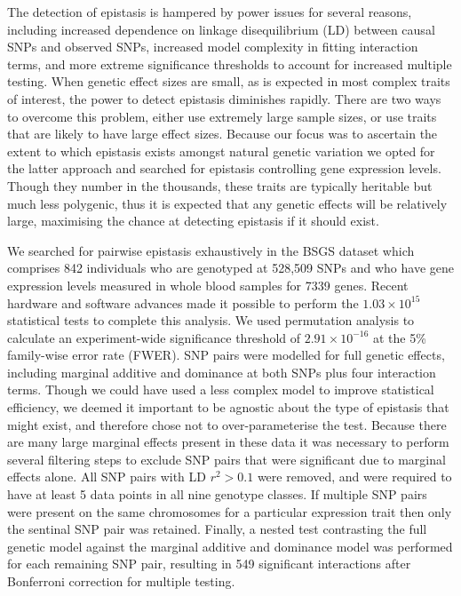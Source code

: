 \documentclass{article}
\begin{document}
The detection of epistasis is hampered by power issues for several reasons, including increased dependence on linkage disequilibrium (LD) between causal SNPs and observed SNPs, increased model complexity in fitting interaction terms, and more extreme significance thresholds to account for increased multiple testing. When genetic effect sizes are small, as is expected in most complex traits of interest, the power to detect epistasis diminishes rapidly. There are two ways to overcome this problem, either use extremely large sample sizes, or use traits that are likely to have large effect sizes. Because our focus was to ascertain the extent to which epistasis exists amongst natural genetic variation we opted for the latter approach and searched for epistasis controlling gene expression levels. Though they number in the thousands, these traits are typically heritable but much less polygenic, thus it is expected that any genetic effects will be relatively large, maximising the chance at detecting epistasis if it should exist.

We searched for pairwise epistasis exhaustively in the BSGS dataset which comprises 842 individuals who are genotyped at 528,509 SNPs and who have gene expression levels measured in whole blood samples for 7339 genes. Recent hardware and software advances made it possible to perform the $1.03 \times 10^{15}$ statistical tests to complete this analysis. We used permutation analysis to calculate an experiment-wide significance threshold of $2.91 \times 10^{-16}$ at the 5\% family-wise error rate (FWER). SNP pairs were modelled for full genetic effects, including marginal additive and dominance at both SNPs plus four interaction terms. Though we could have used a less complex model to improve statistical efficiency, we deemed it important to be agnostic about the type of epistasis that might exist, and therefore chose not to over-parameterise the test. Because there are many large marginal effects present in these data it was necessary to perform several filtering steps to exclude SNP pairs that were significant due to marginal effects alone. All SNP pairs with LD $r^2 > 0.1$ were removed, and were required to have at least 5 data points in all nine genotype classes. If multiple SNP pairs were present on the same chromosomes for a particular expression trait then only the sentinal SNP pair was retained. Finally, a nested test contrasting the full genetic model against the marginal additive and dominance model was performed for each remaining SNP pair, resulting in 549 significant interactions after Bonferroni correction for multiple testing.
\end{document}
